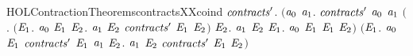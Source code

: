 \newcommand{\HOLContractionTheoremscontractsXXcases}{\UseVerbatim{HOLContractionTheoremscontractsXXcases}}
\begin{SaveVerbatim}{HOLContractionTheoremscontractsXXcoind}
\HOLTokenTurnstile{} \HOLSymConst{\HOLTokenForall{}}\ensuremath{\HOLBoundVar{contracts}\sp{\prime{}}}.
     \ensuremath{(}\HOLSymConst{\HOLTokenForall{}}\ensuremath{\HOLBoundVar{a}\sb{\mathrm{0}}} \ensuremath{\HOLBoundVar{a}\sb{\mathrm{1}}}.
        \ensuremath{\HOLBoundVar{contracts}\sp{\prime{}}} \ensuremath{\HOLBoundVar{a}\sb{\mathrm{0}}} \ensuremath{\HOLBoundVar{a}\sb{\mathrm{1}}} \HOLSymConst{\HOLTokenImp{}}
        \ensuremath{(}\HOLSymConst{\HOLTokenForall{}}. \ensuremath{(}\HOLSymConst{\HOLTokenForall{}}\ensuremath{\HOLBoundVar{E}\sb{\mathrm{1}}}.
                \ensuremath{\HOLBoundVar{a}\sb{\mathrm{0}}} \HOLTokenTransBegin{} \HOLTokenTransEnd \ensuremath{\HOLBoundVar{E}\sb{\mathrm{1}}} \HOLSymConst{\HOLTokenImp{}}
                \HOLSymConst{\HOLTokenExists{}}\ensuremath{\HOLBoundVar{E}\sb{\mathrm{2}}}. \ensuremath{\HOLBoundVar{a}\sb{\mathrm{1}}} \HOLTokenTransBegin{} \HOLTokenTransEnd \ensuremath{\HOLBoundVar{E}\sb{\mathrm{2}}} \HOLSymConst{\HOLTokenConj{}} \ensuremath{\HOLBoundVar{contracts}\sp{\prime{}}} \ensuremath{\HOLBoundVar{E}\sb{\mathrm{1}}} \ensuremath{\HOLBoundVar{E}\sb{\mathrm{2}}}\ensuremath{)} \HOLSymConst{\HOLTokenConj{}}
             \HOLSymConst{\HOLTokenForall{}}\ensuremath{\HOLBoundVar{E}\sb{\mathrm{2}}}.
               \ensuremath{\HOLBoundVar{a}\sb{\mathrm{1}}} \HOLTokenTransBegin{} \HOLTokenTransEnd \ensuremath{\HOLBoundVar{E}\sb{\mathrm{2}}} \HOLSymConst{\HOLTokenImp{}}
               \HOLSymConst{\HOLTokenExists{}}\ensuremath{\HOLBoundVar{E}\sb{\mathrm{1}}}. \ensuremath{\HOLBoundVar{a}\sb{\mathrm{0}}} \HOLTokenWeakTransBegin{} \HOLTokenWeakTransEnd \ensuremath{\HOLBoundVar{E}\sb{\mathrm{1}}} \HOLSymConst{\HOLTokenConj{}}  \ensuremath{\HOLBoundVar{E}\sb{\mathrm{1}}} \ensuremath{\HOLBoundVar{E}\sb{\mathrm{2}}}\ensuremath{)} \HOLSymConst{\HOLTokenConj{}}
        \ensuremath{(}\HOLSymConst{\HOLTokenForall{}}\ensuremath{\HOLBoundVar{E}\sb{\mathrm{1}}}.
           \ensuremath{\HOLBoundVar{a}\sb{\mathrm{0}}} \HOLTokenTransBegin\HOLConst{\ensuremath{\tau}}\HOLTokenTransEnd \ensuremath{\HOLBoundVar{E}\sb{\mathrm{1}}} \HOLSymConst{\HOLTokenImp{}}
           \ensuremath{\HOLBoundVar{contracts}\sp{\prime{}}} \ensuremath{\HOLBoundVar{E}\sb{\mathrm{1}}} \ensuremath{\HOLBoundVar{a}\sb{\mathrm{1}}} \HOLSymConst{\HOLTokenDisj{}} \HOLSymConst{\HOLTokenExists{}}\ensuremath{\HOLBoundVar{E}\sb{\mathrm{2}}}. \ensuremath{\HOLBoundVar{a}\sb{\mathrm{1}}} \HOLTokenTransBegin\HOLConst{\ensuremath{\tau}}\HOLTokenTransEnd \ensuremath{\HOLBoundVar{E}\sb{\mathrm{2}}} \HOLSymConst{\HOLTokenConj{}} \ensuremath{\HOLBoundVar{contracts}\sp{\prime{}}} \ensuremath{\HOLBoundVar{E}\sb{\mathrm{1}}} \ensuremath{\HOLBoundVar{E}\sb{\mathrm{2}}}\ensuremath{)} \HOLSymConst{\HOLTokenConj{}}

\end{SaveVerbatim}

